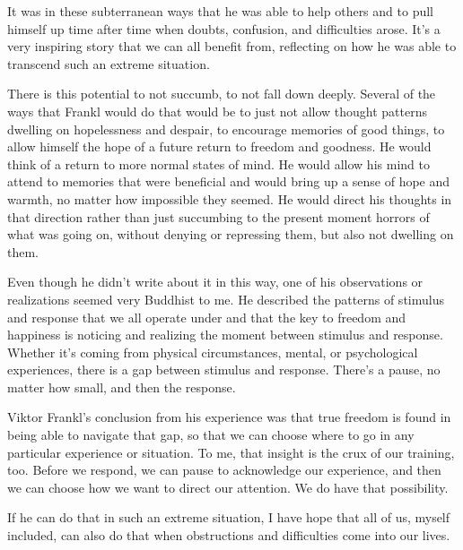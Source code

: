 It was in these subterranean ways that he was able to help others and to pull himself up time after time when doubts, confusion, and difficulties arose. It's a very inspiring story that we can all benefit from, reflecting on how he was able to transcend such an extreme situation.

There is this potential to not succumb, to not fall down deeply. Several of the ways that Frankl would do that would be to just not allow thought patterns dwelling on hopelessness and despair, to encourage memories of good things, to allow himself the hope of a future return to freedom and goodness. He would think of a return to more normal states of mind. He would allow his mind to attend to memories that were beneficial and would bring up a sense of hope and warmth, no matter how impossible they seemed. He would direct his thoughts in that direction rather than just succumbing to the present moment horrors of what was going on, without denying or repressing them, but also not dwelling on them.

Even though he didn't write about it in this way, one of his observations or realizations seemed very Buddhist to me. He described the patterns of stimulus and response that we all operate under and that the key to freedom and happiness is noticing and realizing the moment between stimulus and response. Whether it's coming from physical circumstances, mental, or psychological experiences, there is a gap between stimulus and response. There's a pause, no matter how small, and then the response.

Viktor Frankl's conclusion from his experience was that true freedom is found in being able to navigate that gap, so that we can choose where to go in any particular experience or situation. To me, that insight is the crux of our training, too. Before we respond, we can pause to acknowledge our experience, and then we can choose how we want to direct our attention. We do have that possibility.~

If he can do that in such an extreme situation, I have hope that all of us, myself included, can also do that when obstructions and difficulties come into our lives.

